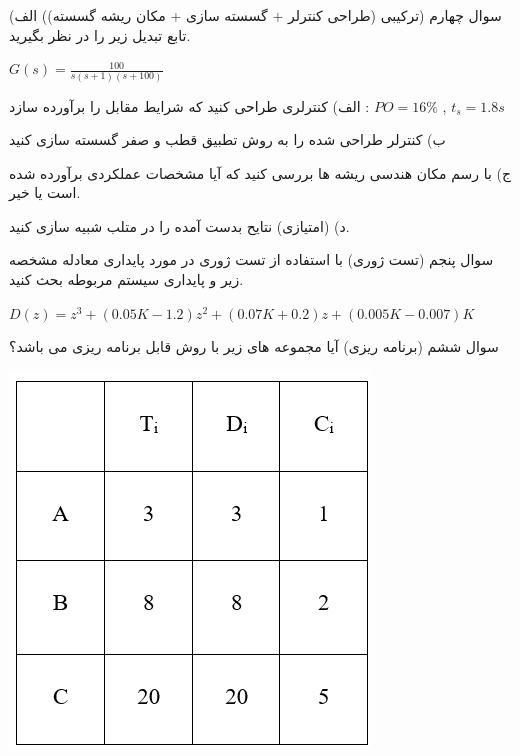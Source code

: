 \documentclass[12pt]{article}
\begin{document}
    \begin{problem}{سوال چهارم}
    	(ترکیبی (طراحی کنترلر + گسسته سازی + مکان ریشه گسسته)) الف) تابع تبدیل زیر را در نظر بگیرید. 
    	
    	\centering
    	$G(s) = \frac{100}{s(s+1)(s+100)}$
    	
    	\raggedright
    	الف) کنترلری طراحی کنید که شرایط مقابل را برآورده سازد : 
    	$PO = 16\%$
    	,
    	$t_s = 1.8 s$
    	
    	ب) کنترلر طراحی شده را به روش تطبیق قطب و صفر گسسته سازی کنید
    	
    	ج) با رسم مکان هندسی ریشه ها بررسی کنید که آیا مشخصات عملکردی برآورده شده است یا خیر.
    	
    	د) (امتیازی) نتایح بدست آمده را در متلب شبیه سازی کنید.
    \end{problem}
    
    \begin{problem}{سوال پنجم}
    	(تست ژوری) با استفاده از تست ژوری در مورد پایداری معادله مشخصه زیر و پایداری سیستم مربوطه بحث کنید.
    	
    	\centering
    	$D(z) = z^3 + (0.05K-1.2)z^2 + (0.07K + 0.2)z + (0.005K - 0.007)K$
    \end{problem}
    
    \begin{problem}{سوال ششم}
    	(برنامه ریزی) آیا مجموعه  های زیر با روش 
    	قابل برنامه ریزی می باشد؟
    	
    	\centering
    	\includegraphics[scale=1]{Resources/2.png}
    \end{problem}
\end{document}
